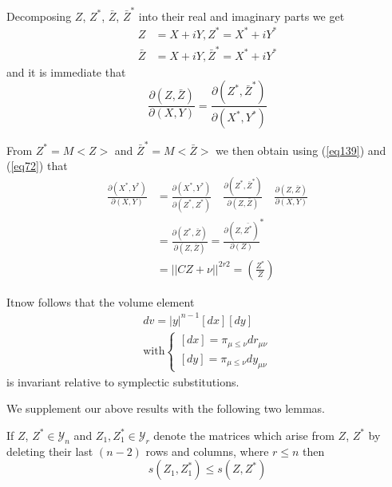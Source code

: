 Decomposing $Z$, $Z^*$, $\bar{Z}$, ${\bar{Z}}^*$ into their real and
imaginary parts we get 
\begin{align*}
Z &= X + iY  , Z^* = X^* + iY^* \\
\bar{Z}& = X + iY , {\bar{Z}}^* = X^* + iY^* 
\end{align*}
and it is immediate that 
$$
\frac{ \partial (Z ,\bar{Z})} {\partial (X ,Y)} = \frac{ \partial (Z^* 
  ,{{\bar{Z}}^*})} {\partial (X^* ,Y^*)} 
$$

From $Z^* = M <Z>$ and ${\bar{Z}}^\ast = M <\bar{Z}>$ we then obtain
using (\ref{eq139}) and (\ref{eq72}) that  
\begin{align*}
\frac{ \partial (X^* ,Y^*)} {\partial (X ,Y)} & = \frac{ \partial (X^*
  ,Y^*)} {\partial (Z^* ,Z^*)} \quad \frac{ \partial (Z^* ,{\bar{Z}}^*)}
     {\partial (Z ,\bar{Z})} \quad \frac{ \partial (Z ,\bar{Z})}
     {\partial (X ,Y)} \\ 
& = \frac{ \partial (Z^* ,\bar{Z})} {\partial (Z ,\bar{Z})} = \frac{
       \partial (Z ,\bar{Z^*})} {\partial (Z)}^* \\ 
& = || C Z + \nu ||^{2 r 2} = (\frac{Z^*}{Z})
\end{align*}

It\pageoriginale  now follows that the volume element
\begin{align*}
d v  = |y|^{n-1} [dx][dy] \tag{140}\label{eq140} \\
\text{with} \begin{cases} [dx] = \pi_{\mu \le \nu} dr_{\mu \nu} \\
 [dy] =  \pi_{\mu \le \nu} dy_{\mu \nu}\end{cases} 
\end{align*}
is invariant relative to symplectic substitutions.

We supplement our above results with the following two lemmas.

\begin{lem}\label{chap7:lem12}%
If $Z$, $Z^* \in \mathscr{Y}_n$ and $Z_1, Z^*_1 \in \mathscr{Y}_r$
denote the matrices which arise from $Z$, $Z^*$ by deleting their last
$(n-2)$ rows and columns, where $r \le n$ then  
\begin{equation*}
s(Z_1 , Z^*_1) \le s(Z , Z^*) \tag{141}\label{eq141}
\end{equation*}
\end{lem}


